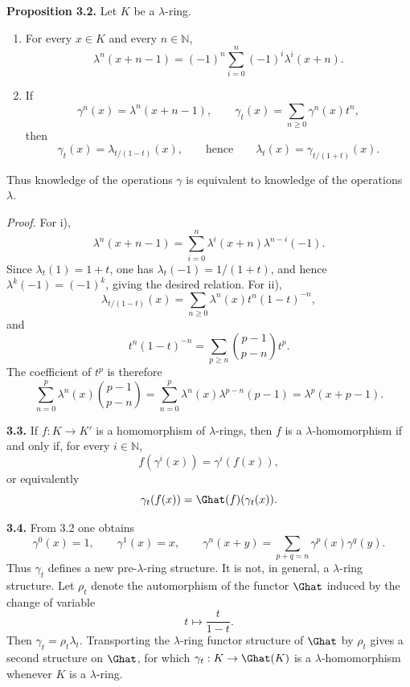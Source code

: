 \textbf{Proposition 3.2.} Let \(K\) be a \(\lambda\)-ring.
\begin{enumerate}[label=\roman*)]
\item For every \(x\in K\) and every \(n\in\mathbb N\),
\[
  \lambda^n(x+n-1)=(-1)^n\sum_{i=0}^n(-1)^i\lambda^i(x+n).
\]
\item If
\[
  \gamma^n(x)=\lambda^n(x+n-1),\qquad
  \gamma_t(x)=\sum_{n\ge0}\gamma^n(x)t^n,
\]
then
\[
  \gamma_t(x)=\lambda_{t/(1-t)}(x),
  \qquad\text{hence}\qquad
  \lambda_t(x)=\gamma_{t/(1+t)}(x).
\]
\end{enumerate}
Thus knowledge of the operations \(\gamma\) is equivalent to knowledge of the operations \(\lambda\).

\emph{Proof.} For i),
\[
  \lambda^n(x+n-1)=\sum_{i=0}^{n}\lambda^i(x+n)\lambda^{n-i}(-1).
\]
Since \(\lambda_t(1)=1+t\), one has \(\lambda_t(-1)=1/(1+t)\), and hence \(\lambda^k(-1)=(-1)^k\), giving the desired relation. For ii),
\[
  \lambda_{t/(1-t)}(x)=\sum_{n\ge0}\lambda^n(x)t^n(1-t)^{-n},
\]
and
\[
  t^n(1-t)^{-n}=\sum_{p\ge n}\binom{p-1}{p-n}t^p.
\]
The coefficient of \(t^p\) is therefore
\[
  \sum_{n=0}^{p}\lambda^n(x)\binom{p-1}{p-n}
  =\sum_{n=0}^{p}\lambda^n(x)\lambda^{p-n}(p-1)
  =\lambda^p(x+p-1).
\]

\textbf{3.3.} If \(f:K\to K'\) is a homomorphism of \(\lambda\)-rings, then \(f\) is a \(\lambda\)-homomorphism if and only if, for every \(i\in\mathbb N\),
\[
  f(\gamma^i(x))=\gamma^i(f(x)),
\]
or equivalently
\[
  \gamma_t(f(x))=\Ghat(f)(\gamma_t(x)).
\]

\textbf{3.4.} From 3.2 one obtains
\begin{equation}\tag{3.4.1}
  \gamma^0(x)=1,
  \qquad \gamma^1(x)=x,
  \qquad \gamma^n(x+y)=\sum_{p+q=n}\gamma^p(x)\gamma^q(y).
\end{equation}
Thus \(\gamma_t\) defines a new pre-\(\lambda\)-ring structure. It is not, in general, a \(\lambda\)-ring structure. Let \(\rho_t\) denote the automorphism of the functor \(\Ghat\) induced by the change of variable
\[
  t\longmapsto \frac{t}{1-t}.
\]
Then \(\gamma_t=\rho_t\lambda_t\). Transporting the \(\lambda\)-ring functor structure of \(\Ghat\) by \(\rho_t\) gives a second structure on \(\Ghat\), for which \(\gamma_t:K\to\Ghat(K)\) is a \(\lambda\)-homomorphism whenever \(K\) is a \(\lambda\)-ring.

